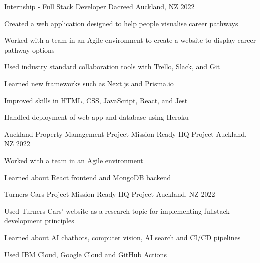 

\begin{cventries}
\cventry
{Internship - Full Stack Developer} %
{Dacreed} %
{Auckland, NZ} %
{2022} %
{
  \begin{cvitems} %
    \item {Created a web application designed to help people visualise career pathways}
    \item {Worked with a team in an Agile environment to create a website to display career pathway options}
    \item {Used industry standard collaboration tools with Trello, Slack, and Git}
    \item {Learned new frameworks such as Next.js and Prisma.io}
    \item {Improved skills in HTML, CSS, JavaScript, React, and Jest}
    \item {Handled deployment of web app and database using Heroku}
  \end{cvitems}
}

\cventry
{Auckland Property Management Project} %
{Mission Ready HQ Project} %
{Auckland, NZ} %
{2022} %
{
  \begin{cvitems} %
    \item {Worked with a team in an Agile environment}
    \item {Learned about React frontend and MongoDB backend}
  \end{cvitems}
}

\cventry
{Turners Cars Project} %
{Mission Ready HQ Project} %
{Auckland, NZ} %
{2022} %
{
  \begin{cvitems} %
    \item {Used Turners Cars' website as a research topic for implementing fullstack development principles}
    \item {Learned about AI chatbots, computer vision, AI search and CI/CD pipelines}
    \item {Used IBM Cloud, Google Cloud and GitHub Actions}
  \end{cvitems}
}


\end{cventries}
